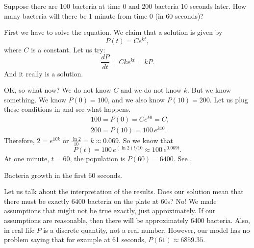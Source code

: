 \documentclass[12pt]{book}
\begin{document}
\begin{example}
Suppose there are 100 bacteria at time 0 and 200 bacteria 10 seconds later.
How many bacteria will there be 1 minute from time 0 (in 60 seconds)?

First we have to solve the equation.  We claim that a solution is given by
\begin{equation*}
P(t) = C e^{kt} ,
\end{equation*}
where $C$ is a constant.  Let us try:
\begin{equation*}
\frac{dP}{dt} = C k e^{kt} = k P .
\end{equation*}
And it really is a solution.

OK, so what now?  We do not know $C$ and we do not know $k$.  But we know
something.  We know $P(0) = 100$, and we also know 
$P(10) = 200$.  Let us plug these conditions in and see what happens.
\begin{align*}
& 100 = P(0) = C e^{k0} = C ,\\
& 200 = P(10) = 100 \, e^{k10} .
\end{align*}
Therefore, $2 = e^{10k}$ or $\frac{\ln 2}{10} = k \approx 0.069$.
So we know that
\begin{equation*}
P(t) = 100 \, e^{(\ln 2) t / 10} \approx 100 \, e^{0.069 t} .
\end{equation*}
At one minute, $t=60$, the population is $P(60) = 6400$.  See
.

\begin{diffyfloatingfigurepdfonly}{3.1in}
\capstart
\begin{center}
\caption{Bacteria growth in the first 60 seconds.\label{intro:plotbactfig}}
\end{center}
\end{diffyfloatingfigurepdfonly}

Let us talk about the interpretation of the results.  Does our solution
mean that
there must be exactly 6400 bacteria on the plate at 60s?  No!  We made
assumptions that might not be true exactly, just approximately.
If our assumptions are reasonable,
then there will be approximately 6400 bacteria.
Also, in real life $P$ is a
discrete quantity, not a real number.  However, our model has no problem saying
that for example at 61 seconds, $P(61) \approx 6859.35$.
\end{example}
\end{document}
